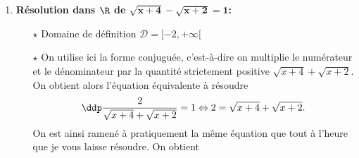 \begin{correction}
\begin{enumerate}
\item \textbf{R\'esolution dans $\mathbf{\R}$ de $\mathbf{\sqrt{x+4}-\sqrt{x+2}=1}$:}\\
\noindent \begin{itemize}
\item[$\star$] Domaine de d\'efinition $\mathcal{D}=\lbrack -2,+\infty\lbrack$ 
\item[$\star$] On utilise ici la forme conjugu\'ee, c'est-\`a-dire on multiplie le num\'erateur et le d\'enominateur par la quantit\'e strictement positive $\sqrt{x+4}+\sqrt{x+2}$. On obtient alors l'\'equation \'equivalente \`a r\'esoudre
$$\ddp\frac{2}{\sqrt{x+4}+\sqrt{x+2}}=1\Leftrightarrow 2=\sqrt{x+4}+\sqrt{x+2}.$$
On est ainsi ramen\'e \`a pratiquement la m\^eme \'equation que tout \`a l'heure que je vous laisse r\'esoudre. On obtient 
\end{itemize}

\end{enumerate}
\end{correction}
